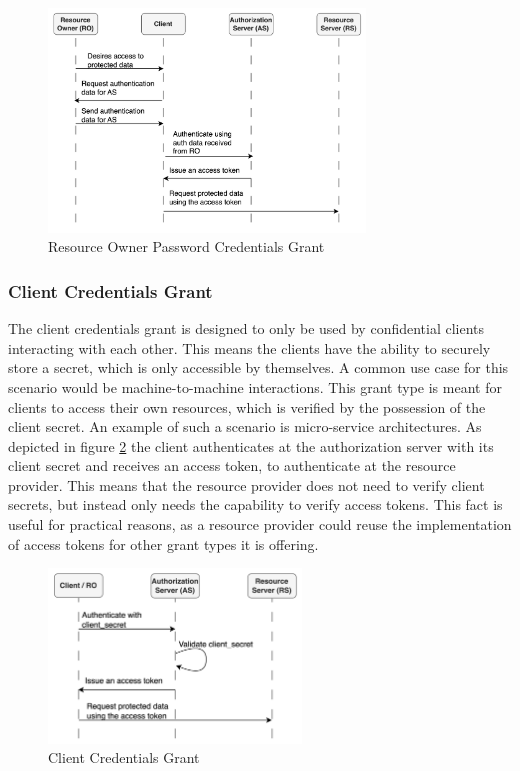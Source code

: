 \documentclass[
    fontsize=12pt,
    headings=small,
    parskip=half,           %
    bibliography=totoc,
    numbers=noenddot,       %
    open=any,               %
    ]{scrreprt}
\begin{document}
\begin{figure}[H]
	\sffamily\footnotesize
	\includegraphics[width=0.75\textwidth]{pic/resource_owner_password_credentials_grant.png}
	\unitlength=0.75mm
	\linethickness{0.4pt}
	\caption{Resource Owner Password Credentials Grant}
	\label{fig:resource_owner_password_credentials_grant}
\end{figure}
	

\subsubsection{Client Credentials Grant}
The client credentials grant is designed to only be used by confidential clients interacting with each other. This means the clients have the ability to securely store a secret, which is only accessible by themselves. A common use case for this scenario would be machine-to-machine interactions. This grant type is meant for clients to access their own resources, which is verified by the possession of the client secret. An example of such a scenario is micro-service architectures. As depicted in figure \ref{fig:client_credentials_grant} the client authenticates at the authorization server with its client secret and receives an access token, to authenticate at the resource provider. This means that the resource provider does not need to verify client secrets, but instead only needs the capability to verify access tokens. This fact is useful for practical reasons, as a resource provider could reuse the implementation of access tokens for other grant types it is offering. \cite{hardt2012rfc}

\begin{figure}[H]
	\sffamily\footnotesize
	\includegraphics[width=0.6\textwidth]{pic/client_credentials_grant.png}
	\unitlength=0.75mm
	\linethickness{0.4pt}
	\caption{Client Credentials Grant}
	\label{fig:client_credentials_grant}
\end{figure}
\end{document}
